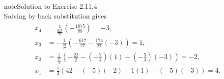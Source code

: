 \documentclass[letterpaper,10pt,english]{jupyterBook}
\begin{document}
\begin{sphinxadmonition}{note}{Solution to Exercise 2.11.4}
\begin{equation*}
\end{equation*}
\sphinxAtStartPar
Solving by back substitution gives
\begin{equation*}
\begin{split} \begin{align*} 
    x_{4} &=  \frac{1}{\frac{625}{98}} \left( - \frac{1875}{98} \right) = -3, \\ 
    x_{3} &=  - \frac{1}{\frac{98}{27}} \left( - \frac{617}{27} - \frac{173}{27} \left( -3 \right) \right) = 1, \\ 
    x_{2} &=  \frac{1}{\frac{27}{4}} \left( - \frac{23}{2} - \left( - \frac{7}{4} \right) \left( 1 \right) - \left( - \frac{5}{4} \right) \left( -3 \right) \right) = -2, \\ 
    x_{1} &=  \frac{1}{4} \left( 42 - \left( -5 \right) \left( -2 \right) - 1 \left( 1 \right) - \left( -5 \right) \left( -3 \right) \right) = 4. 
\end{align*} \end{split}
\end{equation*}\end{sphinxadmonition}
 \label{_pages/A2_Linear_systems_exercises_solutions:_pages/A2_Linear_systems_exercises_solutions-solution-4}
\end{document}
